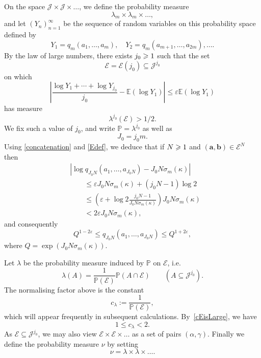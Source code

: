 \documentclass[12pt, reqno]{amsart}
\theoremstyle{definition}
\theoremstyle{remark}
\numberwithin{equation}{section}
\def\alp{{\alpha}} \def\bfalp{{\boldsymbol \alpha}}
\def\gam{{\gamma}} \def\Gam{{\Gamma}}
\def\kap{{\kappa}}
\def\lam{{\lambda}} \def\Lam{{\Lambda}} \def\Lamtil{{\widetilde \Lambda}}
\def\sig{{\sigma}} \def\Sig{{\Sigma}} \def\bfsig{{\boldsymbol \sig}}
\def\eps{\varepsilon}
\def\le{\leqslant} \def\ge{\geqslant}
\def\leq{\leqslant}
\def \sig{{\sigma}}
\def \bE {\mathbb E}
\def \bP {\mathbb P}
\def \ba {\mathbf a}
\def \bb {\mathbf b}
\def \cE {\mathcal E}
\def \cJ {\mathcal J}
\begin{document}
On the space $\cJ \times \cJ \times \ldots$, we define the probability measure 
\[  
\lambda_m \times \lambda_m \times \ldots,
\]
and let $(Y_n)_{n=1}^{\infty}$ be the sequence of random variables on this probability space defined by
\[
Y_1 = q_m(a_1,\ldots,a_m), \quad Y_2 = q_m(a_{m+1},\ldots,a_{2m}),\ldots.
\]
By the law of large numbers, there exists $j_0 \geqslant 1$ such that the  set 
\[
\cE = \cE(j_0) \subseteq \cJ^{j_0}
\]
on which
\begin{equation} \label{Edef}
\left|
\frac{\log Y_1 + \cdots + \log Y_{j_0}}{j_0}
- \bE(\log Y_1)
\right| \le \eps \bE(\log Y_1)
\end{equation}
has measure \begin{equation} \label{cEisLarge}
\lam^{j_0}(\cE) > 1/2.
\end{equation} 
We fix such a value of $j_0$, and write 
$\bP = \lam^{j_0}$ as well as
\[
J_0 = j_0m.
\]
Using \eqref{concatenation} and \eqref{Edef}, we deduce that if $N \geqslant 1$ and $(\ba,\bb) \in \cE^N$ then
\begin{equation} \label{ie_logQJ}
\begin{aligned}
& |\log q_{J_0 N}(a_1,\ldots,a_{J_0 N}) - J_0 N \sig_m(\kap)| \\
& \qquad \le \eps J_0 N \sig_m(\kap) + (j_0N-1) \log 2 \\
& \qquad \le \left(\eps + \log 2\frac{j_0 N -1}{J_0 N \sigma_m(\kappa) } \right) J_0 N \sig_m(\kap)\\
& \qquad < 2\eps J_0 N \sig_m(\kap),
\end{aligned}
\end{equation}
and consequently
\begin{equation} \label{Qest}
Q^{1-2\eps} \le 
q_{J_0N}(a_1,\ldots,a_{J_0N}) \le Q^{1+2\eps},
\end{equation}
where $Q = \exp\left(J_0 N \sig_m(\kap)\right)$.

Let $\lam$ be the probability measure induced by $\bP$ on $\cE$, i.e.
\[
\lambda(A) = \frac{1}{\bP(\cE)}\bP(A\cap \cE) 
\qquad 
(A \subseteq \cJ^{j_0}).
\]
The normalising factor above is the constant
\begin{equation} 
\label{def_c_lambda}
c_{\lambda}:=\frac{1}{\bP(\cE)}, 
\end{equation}
which will appear frequently in subsequent calculations. By~\eqref{cEisLarge}, we have
\[
1\leq c_\lambda < 2.
\]
As $\cE \subseteq \cJ^{j_0}$,
we may also view $\cE \times \cE \times \ldots$ as a set of pairs $(\alp, \gam).$ Finally we define the probability measure $\nu$ by setting
\begin{equation} \label{def_nu}
\nu = \lam\times\lam\times\ldots.
\end{equation}
\end{document}
